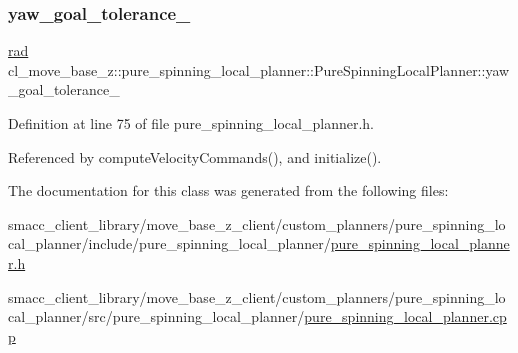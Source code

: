 \mbox{\label{classcl__move__base__z_1_1pure__spinning__local__planner_1_1PureSpinningLocalPlanner_a07334cd7bf29f391c2553f0038fa94e8}} 
\subsubsection{\texorpdfstring{yaw\+\_\+goal\+\_\+tolerance\+\_\+}{yaw\_goal\_tolerance\_}}
{\footnotesize\ttfamily \hyperlink{backward__local__planner_8h_a640effbe91ae9b25d698a883a9e80d96}{rad} cl\+\_\+move\+\_\+base\+\_\+z\+::pure\+\_\+spinning\+\_\+local\+\_\+planner\+::\+Pure\+Spinning\+Local\+Planner\+::yaw\+\_\+goal\+\_\+tolerance\+\_\+\hspace{0.3cm}{\ttfamily [private]}}



Definition at line 75 of file pure\+\_\+spinning\+\_\+local\+\_\+planner.\+h.



Referenced by compute\+Velocity\+Commands(), and initialize().



The documentation for this class was generated from the following files\+:\begin{DoxyCompactItemize}
\item 
smacc\+\_\+client\+\_\+library/move\+\_\+base\+\_\+z\+\_\+client/custom\+\_\+planners/pure\+\_\+spinning\+\_\+local\+\_\+planner/include/pure\+\_\+spinning\+\_\+local\+\_\+planner/\hyperlink{pure__spinning__local__planner_8h}{pure\+\_\+spinning\+\_\+local\+\_\+planner.\+h}\item 
smacc\+\_\+client\+\_\+library/move\+\_\+base\+\_\+z\+\_\+client/custom\+\_\+planners/pure\+\_\+spinning\+\_\+local\+\_\+planner/src/pure\+\_\+spinning\+\_\+local\+\_\+planner/\hyperlink{pure__spinning__local__planner_8cpp}{pure\+\_\+spinning\+\_\+local\+\_\+planner.\+cpp}\end{DoxyCompactItemize}
